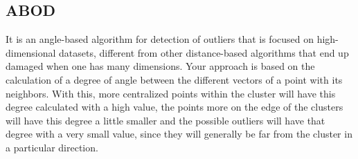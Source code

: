 
\subsection{ABOD}

It is an angle-based algorithm for detection of outliers that is focused on high-dimensional
datasets, different from other distance-based algorithms that end up damaged when one has
many dimensions. Your approach is based on the calculation of a degree of angle between the
different vectors of a point with its neighbors. With this, more centralized points within
the cluster will have this degree calculated with a high value, the points more on the edge
of the clusters will have this degree a little smaller and the possible outliers will have
that degree with a very small value, since they will generally be far from the cluster in a
particular direction.



